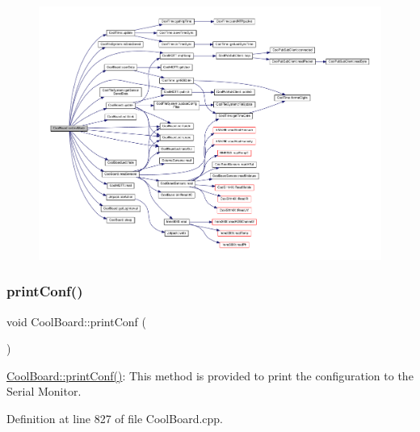 \begin{figure}[H]
\begin{center}
\leavevmode
\includegraphics[width=350pt]{d7/df9/class_cool_board_aa0bbc4bc605e35618d18e68795c61363_cgraph}
\end{center}
\end{figure}
\mbox{\label{class_cool_board_a486507b8f0981d3cc671ed31c2145755}} 
\subsubsection{\texorpdfstring{print\+Conf()}{printConf()}}
{\footnotesize\ttfamily void Cool\+Board\+::print\+Conf (\begin{DoxyParamCaption}{ }\end{DoxyParamCaption})}

\hyperlink{class_cool_board_a486507b8f0981d3cc671ed31c2145755}{Cool\+Board\+::print\+Conf()}\+: This method is provided to print the configuration to the Serial Monitor. 

Definition at line 827 of file Cool\+Board.\+cpp.


